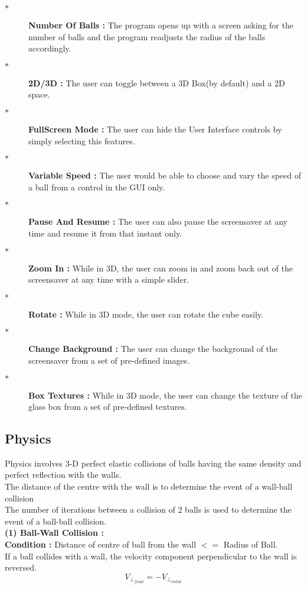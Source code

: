 \documentclass[a4paper]{article}
\begin{document}
\begin{description}
\item[$\ast$ ] \textbf{Number Of Balls : }The program opens up with a screen asking for the number of balls and the program readjusts the radius of the balls accordingly.
\item[$\ast$ ] \textbf{2D/3D : }The user can toggle between a 3D Box(by default) and a 2D space.
\item[$\ast$ ] \textbf{FullScreen Mode : }The user can hide the User Interface controls by simply selecting this features.
\item[$\ast$ ] \textbf{Variable Speed : }The user would be able to choose and vary the speed of a ball from a control in the GUI only.
\item[$\ast$ ] \textbf{Pause And Resume : }The user can also pause the screensaver at any time and resume it from that instant only.
\item[$\ast$ ] \textbf{Zoom In : } While in 3D, the user can zoom in and zoom back out of the screensaver at any time with a simple slider.
\item[$\ast$ ] \textbf{Rotate : }While in 3D mode, the user can rotate the cube easily.
\item[$\ast$ ] \textbf{Change Background : } The user can change the background of the screensaver from a set of pre-defined images.
\item[$\ast$ ] \textbf{Box Textures : }While in 3D mode, the user can change the texture of the glass box from a set of pre-defined textures.

\end{description}


\subsection{Physics}

Physics involves 3-D perfect elastic collisions of balls having the same density and perfect reflection with the walls. \\

The distance of the centre with the wall is to determine the event of a wall-ball collision\\
The number of iterations between a collision of 2 balls is used to determine the event of a ball-ball collision.\\



\textbf{(1) Ball-Wall Collision : }\\
\textbf{Condition : }Distance of centre of ball from the wall $<=$ Radius of Ball.\\
If a ball collides with a wall, the velocity component perpendicular to the wall is reversed.
\begin{equation}
V_{\perp_{ final}} = - V_{\perp_{inital}} 
\end{equation}
\end{document}
